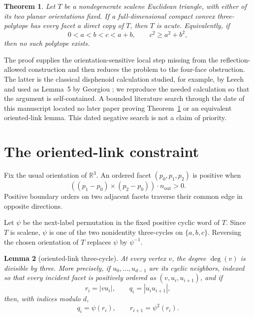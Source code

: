 \documentclass[11pt]{article}
\newtheorem{theorem}{Theorem}
\newtheorem{lemma}[theorem]{Lemma}
\newcommand{\R}{\mathbb{R}}
\begin{document}
\begin{theorem}\label{thm:main}
Let $T$ be a nondegenerate scalene Euclidean triangle, with either of its two
planar orientations fixed.  If a full-dimensional compact convex
three-polytope has every facet a direct copy of $T$, then $T$ is acute.
Equivalently, if
\[
  0<a<b<c<a+b, \qquad c^2\geq a^2+b^2,
\]
then no such polytope exists.
\end{theorem}

The proof supplies the orientation-sensitive local step missing from the
reflection-allowed construction and then reduces the problem to the
four-face obstruction.  The latter is the classical disphenoid calculation
studied, for example, by Leech \cite{Leech1950} and used as Lemma~5 by
Georgiou \cite{Georgiou2026}; we reproduce the needed calculation so that the
argument is self-contained.  A bounded literature search through the date of
this manuscript located no later paper proving Theorem~\ref{thm:main} or an
equivalent oriented-link lemma.  This dated negative search is not a claim of
priority.

\section{The oriented-link constraint}

Fix the usual orientation of $\R^3$.  An ordered facet $(p_0,p_1,p_2)$ is
positive when
\[
 ((p_1-p_0)\times(p_2-p_0))\mathbin{\cdot}n_{\mathrm{out}}>0.
\]
Positive boundary orders on two adjacent facets traverse their common edge
in opposite directions.

Let $\psi$ be the next-label permutation in the fixed positive cyclic word
of $T$.  Since $T$ is scalene, $\psi$ is one of the two nonidentity
three-cycles on $\{a,b,c\}$.  Reversing the chosen orientation of $T$
replaces $\psi$ by $\psi^{-1}$.

\begin{lemma}[oriented-link three-cycle]\label{lem:link}
At every vertex $v$, the degree $\deg(v)$ is divisible by three.
More precisely, if $u_0,\ldots,u_{d-1}$ are its cyclic neighbors, indexed so
that every incident facet is positively ordered as
$(v,u_i,u_{i+1})$, and if
\[
 r_i=|vu_i|, \qquad q_i=|u_i u_{i+1}|,
\]
then, with indices modulo $d$,
\begin{equation}\label{eq:transition}
 q_i=\psi(r_i), \qquad r_{i+1}=\psi^2(r_i).
\end{equation}
\end{lemma}
\end{document}
